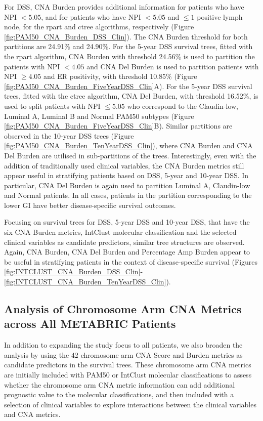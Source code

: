 For DSS, CNA Burden provides additional information for patients who have NPI $< 5.05$, and for patients who have NPI $< 5.05$ and $\leq 1$ positive lymph node, for the rpart and ctree algorithms, respectively (Figure \ref{fig:PAM50_CNA_Burden_DSS_Clin}). The CNA Burden threshold for both partitions are 24.91\% and 24.90\%. For the 5-year DSS survival trees, fitted with the rpart algorithm, CNA Burden with threshold 24.56\% is used \FloatBarrier \noindent to partition the patients with NPI $< 4.05$ and CNA Del Burden is used to partition patients with NPI $\geq 4.05$ and ER positivity, with threshold 10.85\% (Figure \ref{fig:PAM50_CNA_Burden_FiveYearDSS_Clin}A). For the 5-year DSS survival trees, fitted with the ctree algorithm, CNA Del Burden, with threshold 16.52\%, is used to split patients with NPI $\leq 5.05$ who correspond to the Claudin-low, Luminal A, Luminal B and Normal PAM50 subtypes (Figure \ref{fig:PAM50_CNA_Burden_FiveYearDSS_Clin}B). Similar partitions are observed in the 10-year DSS trees (Figure \ref{fig:PAM50_CNA_Burden_TenYearDSS_Clin}), where CNA Burden and CNA Del Burden are utilised in sub-partitions of the trees. Interestingly, even with the addition of traditionally used clinical variables, the CNA Burden metrics still appear useful in stratifying patients based on DSS, 5-year and 10-year DSS. In particular, CNA Del Burden is again used to partition Luminal A, Claudin-low and Normal patients. In all cases, patients in the partition corresponding to the lower GI have better disease-specific survival outcomes.

Focusing on survival trees for DSS, 5-year DSS and 10-year DSS, that have the six CNA Burden metrics, IntClust molecular classification and the selected clinical variables as candidate predictors, similar tree structures are observed. Again, CNA Burden, CNA Del Burden and Percentage Amp Burden appear to be useful in stratifying patients in the context of disease-specific survival (Figures \ref{fig:INTCLUST_CNA_Burden_DSS_Clin}-\ref{fig:INTCLUST_CNA_Burden_TenYearDSS_Clin}). 

\subsection{Analysis of Chromosome Arm CNA Metrics across All METABRIC Patients}
\label{Trees_Arm}
In addition to expanding the study focus to all patients, we also broaden the analysis by using the 42 chromosome arm CNA Score and Burden metrics as candidate predictors in the survival trees. These chromosome arm CNA metrics are initially included with PAM50 or IntClust molecular classifications to assess whether the chromosome arm CNA metric information can add additional prognostic value to the molecular classifications, and then included with a selection of clinical variables to explore interactions between the clinical variables and CNA metrics.

